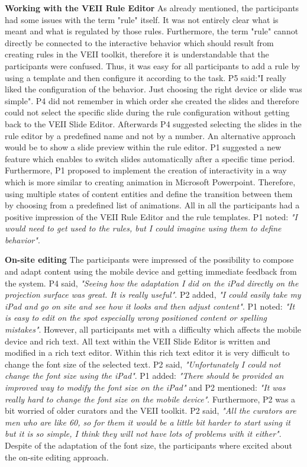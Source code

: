 \textbf{Working with the VEII Rule Editor}
\newline
As already mentioned, the participants had some issues with the term "rule" itself. It was not entirely clear what is meant and what is regulated by those rules. Furthermore, the term "rule" cannot directly be connected to the interactive behavior which should result from creating rules in the VEII toolkit, therefore it is understandable that the participants were confused. Thus, it was easy for all participants to add a rule by using a template and then configure it according to the task. P5 said:{"I really liked the configuration of the behavior. Just choosing the right device or slide was simple"}. P4 did not remember in which order she created the slides and therefore could not select the specific slide during the rule configuration without getting back to the VEII Slide Editor. Afterwards P4 suggested selecting the slides in the rule editor by a predefined name and not by a number. An alternative approach would be to show a slide preview within the rule editor. P1 suggested a new feature which enables to switch slides automatically after a specific time period. Furthermore, P1 proposed to implement the creation of interactivity in a way which is more similar to creating animation in Microsoft Powerpoint. Therefore, using multiple states of content entities and define the transition between them by choosing from a predefined list of animations. All in all the participants had a positive impression of the VEII Rule Editor and the rule templates. P1 noted: \textit{"I would need to get used to the rules, but I could imagine using them to define behavior"}.
\newline

\textbf{On-site editing}
\newline
The participants were impressed of the possibility to compose and adapt content using the mobile device and getting immediate feedback from the system. P4 said, \textit{"Seeing how the adaptation I did on the iPad directly on the projection surface was great. It is really useful"}. P2 added, \textit{"I could easily take my iPad and go on site and see how it looks and then adjust content"}. P1 noted: \textit{"It is easy to edit on the spot especially wrong positioned content or spelling mistakes"}. However, all participants met with a difficulty which affects the mobile device and rich text. All text within the VEII Slide Editor is written and modified in a rich text editor. Within this rich text editor it is very difficult to change the font size of the selected text. P2 said, \textit{"Unfortunately I could not change the font size using the iPad"}. P1 added: \textit{"There should be provided an improved way to modify the font size on the iPad"} and P2 mentioned: \textit{"It was really hard to change the font size on the mobile device"}. Furthermore, P2 was a bit worried of older curators and the VEII toolkit. P2 said, \textit{"All the curators are men who are like 60, so for them it would be a little bit harder to start using it but it is so simple, I think they will not have lots of problems with it either"}. Despite of the adaptation of the font size, the participants where excited about the on-site editing approach.


